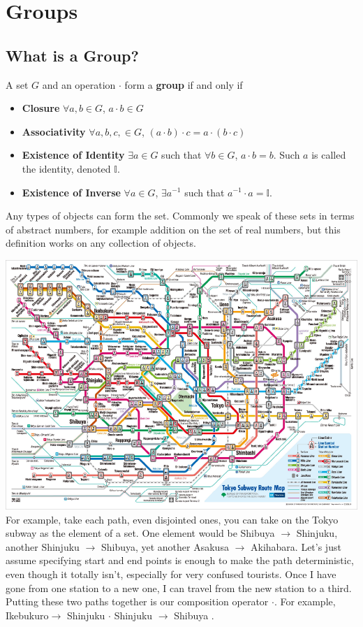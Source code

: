 \chapter{Groups}

\section{What is a Group?}

\begin{definition}[Groups]
  A set $G$ and an operation $\cdot$ form a \textbf{group} if and only if
  \begin{itemize}[noitemsep]
    \item \textbf{Closure} $\forall a,b \in G$, $a\cdot b \in G$
    \item \textbf{Associativity} $\forall a,b,c, \in G$, $(a \cdot b) \cdot c = a \cdot (b \cdot c)$
    \item \textbf{Existence of Identity} $\exists a \in G$ such that $\forall b \in G$, $a \cdot b = b$.  Such $a$ is called the identity, denoted $\mathbb{I}$.
    \item \textbf{Existence of Inverse} $\forall a \in G$, $\exists a^{-1}$ such that $a^{-1} \cdot a = \mathbb{I}$.
  \end{itemize}
\end{definition}

Any types of objects can form the set.  Commonly we speak of these sets in terms of abstract numbers, for example addition on the set of real numbers, but this definition works on any collection of objects.


\includegraphics[width=\textwidth]{pics/tokyo_subway.png}
For example, take each path, even disjointed ones, you can take on the Tokyo subway as the element of a set. One element would be Shibuya $\rightarrow$ Shinjuku, another Shinjuku $\rightarrow$ Shibuya, yet another Asakusa $\rightarrow$ Akihabara.  Let's just assume specifying start and end points is enough to make the path deterministic, even though it totally isn't, especially for very confused tourists.  Once I have gone from one station to a new one, I can travel from the new station to a third.  Putting these two paths together is our composition operator $\cdot$.  For example, Ikebukuro$\rightarrow$ Shinjuku $\cdot$ Shinjuku $\rightarrow$ Shibuya .

